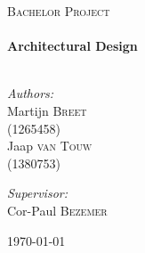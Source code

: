 \begin{titlepage}

\begin{center}



\textsc{\LARGE Bachelor Project }\\[1.5cm]


\HRule \\[0.4cm]
{ \huge \bfseries Architectural Design}\\[0.4cm]

\HRule \\[1.5cm]

\begin{minipage}{0.4\textwidth}
\begin{flushleft} \large
\emph{Authors:}\\
Martijn \textsc{Breet} \\ (1265458) \\ [0.1cm]
Jaap \textsc{van Touw} \\(1380753)\\ [0.1cm]
\end{flushleft}
\end{minipage}
\begin{minipage}{0.4\textwidth}
\begin{flushright} \large
\emph{Supervisor:} \\
Cor-Paul \textsc{Bezemer}
\end{flushright}
\end{minipage}

\vfill

{\large \today}

\end{center}

\end{titlepage}

